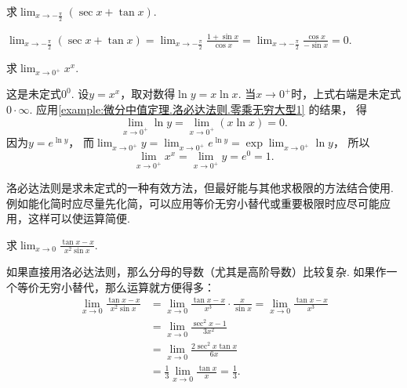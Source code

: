 \begin{example}
求\(\lim_{x\to-\frac\pi2} (\sec x+\tan x)\).
\begin{solution}
\(\lim_{x\to-\frac\pi2} (\sec x+\tan x)
= \lim_{x\to-\frac\pi2} \frac{1+\sin x}{\cos x}
= \lim_{x\to-\frac\pi2} \frac{\cos x}{-\sin x}
= 0\).
\end{solution}
\end{example}

\begin{example}\label{example:微分中值定理.洛必达法则.零次方零型1}
求\(\lim_{x\to0^+} x^x\).
\begin{solution}
这是未定式\(0^0\).
设\(y = x^x\)，取对数得\(\ln y = x \ln x\).
当\(x\to0^+\)时，上式右端是未定式\(0\cdot\infty\).
应用\cref{example:微分中值定理.洛必达法则.零乘无穷大型1} 的结果，
得\[
	\lim_{x\to0^+} \ln y
	= \lim_{x\to0^+} (x \ln x) = 0.
\]
因为\(y = e^{\ln y}\)，
而\(\lim_{x\to0^+} y
= \lim_{x\to0^+} e^{\ln y}
= \exp\lim_{x\to0^+} \ln y\)，
所以\[
	\lim_{x\to0^+} x^x
	= \lim_{x\to0^+} y
	= e^0
	= 1.
\]
\end{solution}
\end{example}

洛必达法则是求未定式的一种有效方法，但最好能与其他求极限的方法结合使用.
例如能化简时应尽量先化简，可以应用等价无穷小替代或重要极限时应尽可能应用，这样可以使运算简便.

\begin{example}
求\(\lim_{x\to0} \frac{\tan x - x}{x^2 \sin x}\).
\begin{solution}
如果直接用洛必达法则，那么分母的导数（尤其是高阶导数）比较复杂.
如果作一个等价无穷小替代，那么运算就方便得多：
\begin{align*}
	\lim_{x\to0} \frac{\tan x - x}{x^2 \sin x}
	&= \lim_{x\to0} \frac{\tan x - x}{x^3} \cdot \frac{x}{\sin x}
	= \lim_{x\to0} \frac{\tan x - x}{x^3} \\
	&= \lim_{x\to0} \frac{\sec^2 x - 1}{3x^2} \\
	&= \lim_{x\to0} \frac{2\sec^2 x \tan x}{6x} \\
	&= \frac13 \lim_{x\to0} \frac{\tan x}{x} = \frac13.
\end{align*}
\end{solution}
\end{example}


